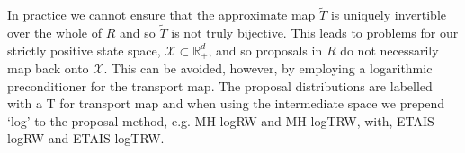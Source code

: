 \documentclass[final]{siamltex}
\newcommand{\edit}[1]{#1}
\newcommand\irregularcircle[2]{%
  \pgfextra {\pgfmathsetmacro\len{(#1)+rand*(#2)}}
  +(0:\len pt)
  \foreach \a in {10,20,...,350}{
    \pgfextra {\pgfmathsetmacro\len{(#1)+rand*(#2)}}
    -- +(\a:\len pt)
  } -- cycle
}
\begin{document}




In practice we cannot ensure that the approximate map $\tilde{T}$
is uniquely invertible over the whole of $R$ and so $\tilde{T}$ is not
truly bijective. This leads to problems for our strictly positive
state space, $\mathcal{X} \subset \mathbb{R}_+^d$, and so proposals in
$R$ do not necessarily map back onto $\mathcal{X}$. \edit{This can be
  avoided, however, by employing a logarithmic preconditioner for the
  transport map. The proposal distributions are labelled with a T for transport map and when using the intermediate space we prepend `log' to the proposal method, e.g. MH-logRW and MH-logTRW, with, ETAIS-logRW and ETAIS-logTRW.}



\end{document}

